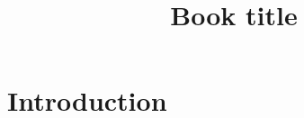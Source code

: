 \documentclass[11pt]{article}
\title{Book title}
\author{}
\date{}
\begin{document}
\maketitle

\begin{abstract}
\end{abstract}

\section{Introduction}



\end{document}
